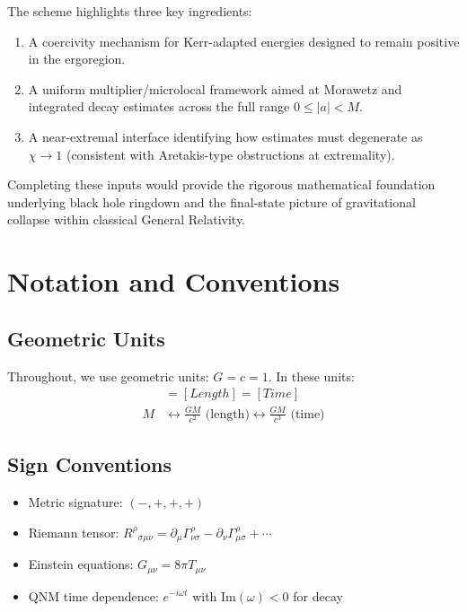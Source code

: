 \documentclass[12pt,a4paper]{article}
\begin{document}
The scheme highlights three key ingredients:
\begin{enumerate}
    \item A coercivity mechanism for Kerr-adapted energies designed to remain positive in the ergoregion.
    \item A uniform multiplier/microlocal framework aimed at Morawetz and integrated decay estimates across the full range $0 \leq |a| < M$.
    \item A near-extremal interface identifying how estimates must degenerate as $\chi\to 1$ (consistent with Aretakis-type obstructions at extremality).
\end{enumerate}

Completing these inputs would provide the rigorous mathematical foundation underlying black hole ringdown and the final-state picture of gravitational collapse within classical General Relativity.

\newpage

\section{Notation and Conventions}\label{app:notation}

\subsection{Geometric Units}

Throughout, we use geometric units: $G = c = 1$. In these units:
\begin{align}
[Mass] &= [Length] = [Time] \\
M &\leftrightarrow \frac{GM}{c^2} \text{ (length)} \leftrightarrow \frac{GM}{c^3} \text{ (time)}
\end{align}

\subsection{Sign Conventions}

\begin{itemize}
    \item Metric signature: $(-,+,+,+)$
    \item Riemann tensor: $R^\rho{}_{\sigma\mu\nu} = \partial_\mu \Gamma^\rho_{\nu\sigma} - \partial_\nu \Gamma^\rho_{\mu\sigma} + \cdots$
    \item Einstein equations: $G_{\mu\nu} = 8\pi T_{\mu\nu}$
    \item QNM time dependence: $e^{-i\omega t}$ with $\text{Im}(\omega) < 0$ for decay
\end{itemize}
\end{document}
